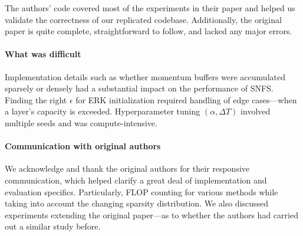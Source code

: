 The authors' code covered most of the experiments in their paper and helped us validate the correctness of our replicated codebase. Additionally, the original paper is quite complete, straightforward to follow, and lacked any major errors.

\paragraph{What was difficult}

Implementation details such as whether momentum buffers were accumulated sparsely or densely had a substantial impact on the performance of SNFS. Finding the right $\epsilon$ for ERK initialization required handling of edge cases---when a layer's capacity is exceeded. Hyperparameter tuning $(\alpha, \Delta T)$ involved multiple seeds and was compute-intensive.


\paragraph{Communication with original authors}


We acknowledge and thank the original authors for their responsive communication, which helped clarify a great deal of implementation and evaluation specifics. Particularly, FLOP counting for various methods while taking into account the changing sparsity distribution. We also discussed experiments extending the original paper---as to whether the authors had carried out a similar study before.